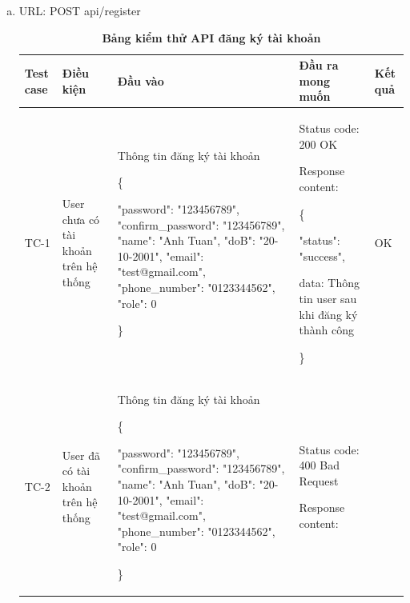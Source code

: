 \begin{enumerate}[a)]
  \item URL: POST api/register
  
\break

  \begin{xltabular}{\textwidth}{
    | >{\raggedright\arraybackslash}p{1cm}
    | >{\raggedright\arraybackslash}p{2.5cm}
    | >{\raggedright\arraybackslash}X
    | >{\raggedright\arraybackslash}X
    | >{\raggedright\arraybackslash}p{1cm}|
    }
    \caption{\bfseries \fontsize{12pt}{0pt}\selectfont Bảng kiểm thử API đăng ký tài khoản}
    \\
    \hline
    \bfseries Test case    &\bfseries Điều kiện   &\bfseries Đầu vào 
    &\bfseries Đầu ra mong muốn &\bfseries Kết quả\\ \hline
  
  
    TC-1
    & User chưa có tài khoản trên hệ thống
    & Thông tin đăng ký tài khoản

    \{

    "password": "123456789",
    "confirm\_password": "123456789",
    "name": "Anh Tuan",
    "doB": "20-10-2001",
    "email": "test@gmail.com",
    "phone\_number": "0123344562",
    "role": 0

   \}
  
    & 
  
    Status code: 200 OK
  
      Response content:
  
      \{
  
    "status": "success",
  
    data: Thông tin user sau khi đăng ký thành công
  
    \}
    
    & OK
  
    \\ \hline
  
    TC-2
    & User đã có tài khoản trên hệ thống
    & Thông tin đăng ký tài khoản

    \{

    "password": "123456789",
    "confirm\_password": "123456789",
    "name": "Anh Tuan",
    "doB": "20-10-2001",
    "email": "test@gmail.com",
    "phone\_number": "0123344562",
    "role": 0

   \}
  
    & 
  
    Status code: 400 Bad Request
  
      Response content:
  

\end{xltabular}
\end{enumerate}
